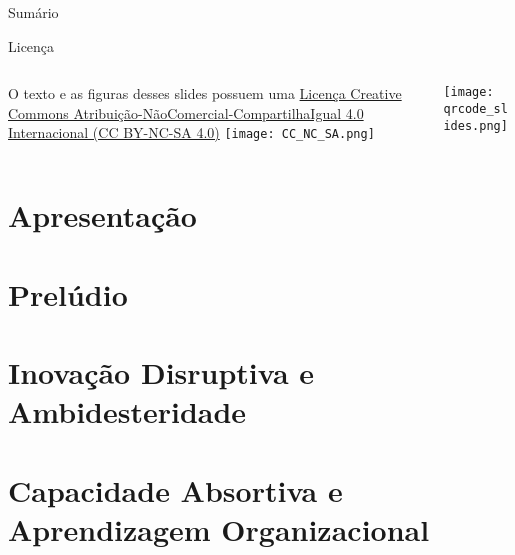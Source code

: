 \maketitle

\begin{frame}{Sumário}
    \tableofcontents
\end{frame}

\begin{frame}{Licença}
    \begin{columns}
        \begin{column}{0.5\textwidth}
            O texto e as figuras desses slides possuem uma
            \href{https://creativecommons.org/licenses/by-nc-sa/4.0/deed.pt}{Licença
            Creative Commons
            Atribuição-NãoComercial-CompartilhaIgual 4.0 Internacional (CC BY-NC-SA 4.0)}
            \vfill
            \centering
            \vspace{1em}
            \texttt{[image: CC\_NC\_SA.png]}
        \end{column}
        \begin{column}{0.5\textwidth}
            \centering
            \texttt{[image: qrcode\_slides.png]}
        \end{column}
    \end{columns}
    \vfill
\end{frame}

\section{Apresentação}


\section{Prelúdio}


\section{Inovação Disruptiva e Ambidesteridade}


\section{Capacidade Absortiva e Aprendizagem Organizacional}

